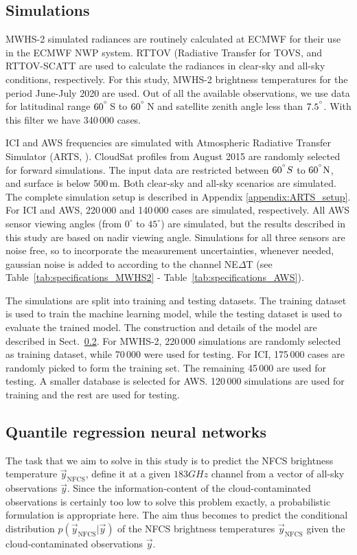 \documentclass[amt, manuscript]{copernicus}
\newcommand{\todo}[1]{{\color{red} #1}}
\newcommand{\ynfcs}{\vec{y}_\text{NFCS}}
\newcommand{\y}{\vec{y}}
\begin{document}
\subsection{Simulations}
%
MWHS-2 simulated radiances are routinely calculated at ECMWF for their use in the ECMWF NWP system. RTTOV (Radiative Transfer for TOVS, \citet{saunders2018update} and RTTOV-SCATT \citep{bauer2006rttovscat} are used to calculate the radiances in clear-sky and all-sky conditions, respectively. For this study, MWHS-2 brightness temperatures for the period June-July 2020 are used. Out of all the available observations, we use data for latitudinal range $60^{^{\circ}}$\,S to $60^{^{\circ}}$\,N and satellite zenith angle less than $7.5^{^{\circ}}$. With this filter we have 340\,000 cases.

ICI and AWS frequencies are simulated with Atmospheric Radiative Transfer
Simulator (ARTS, \citet{buehler:artst:18}). CloudSat
\citep{Stephens2002cloudsat} profiles from August 2015 are randomly selected for
forward simulations. The input data are restricted between $60\unit{^{\degree}}S$ to
$60\unit{^{\degree}N}$, and surface is below 500\,m. Both clear-sky and all-sky
scenarios are simulated. The complete simulation setup is described in Appendix
\ref{appendix:ARTS_setup}. For ICI and AWS, 220\,000 and 140\,000 cases are
simulated, respectively. All AWS sensor viewing angles (from $0^\circ$ to
$45^\circ$) are simulated, but the results described in this study are based on
nadir viewing angle. Simulations for all three sensors are noise free, so to
incorporate the measurement uncertainties, whenever needed, gaussian noise is
added to according to the channel NE$\Delta$T (see
Table~\ref{tab:specifications_MWHS2} - Table~\ref{tab:specifications_AWS}).

The simulations are split into training and testing datasets. The training dataset is used to train the machine learning model, while the testing dataset is used to evaluate the trained model. The construction and details of the model are described in Sect.~\ref{sec:QRNN}. For MWHS-2, 220\,000 simulations are randomly selected as training dataset, while 70\,000 were used for testing. For ICI, 175\,000 cases are randomly picked to form the training set. The remaining 45\,000 are used for testing. A smaller database is selected for AWS. 120\,000 simulations are used for training and the rest are used for testing.

\subsection{Quantile regression neural networks}
\label{sec:QRNN}
%
The task that we aim to solve in this study is to predict the NFCS brightness
temperature \todo{$\ynfcs$, define it} at a given $183\unit{GHz}$ channel from a vector of
all-sky observations $\y$. Since the information-content of the
cloud-contaminated observations is certainly too low to solve this problem
exactly, a probabilistic formulation is appropriate here. The aim thus becomes
to predict the conditional distribution $p(\ynfcs | \y)$ of the NFCS brightness
temperatures $\ynfcs$ given the cloud-contaminated observations $\y$.
\end{document}
